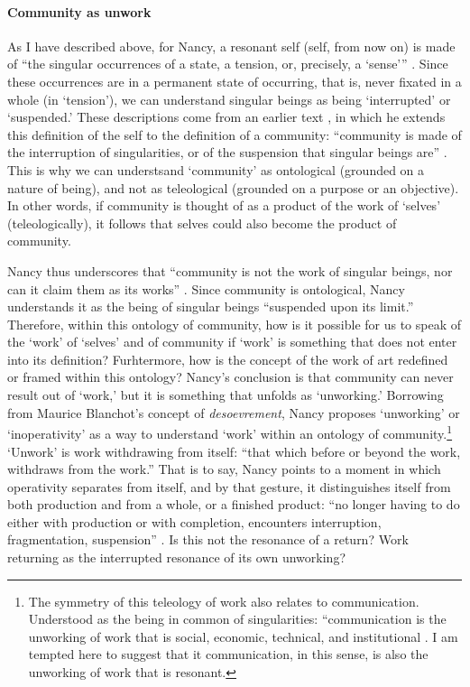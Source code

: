 \paragraph{Community as unwork}
As I have described above, for Nancy, a resonant self (self, from now on) is made of ``the singular occurrences of a state, a tension, or, precisely, a `sense''' \parencite[8]{Nan07:Lis}. Since these occurrences are in a permanent state of occurring, that is, never fixated in a whole (in `tension'), we can understand singular beings as being `interrupted' or `suspended.' These descriptions come from an earlier text \textcite{Nan91:The}, in which he extends this definition of the self to the definition of a community: ``community is made of the interruption of singularities, or of the suspension that singular beings are'' \parencite[31][All subsequent quotes from this passage.]{Nan91:The}. This is why we can understsand `community' as ontological (grounded on a nature of being), and not as teleological (grounded on a purpose or an objective). In other words, if community is thought of as a product of the work of `selves' (teleologically), it follows that selves could also become the product of community. 


Nancy thus underscores that ``community is not the work of singular beings, nor can it claim them as its works'' . Since community is ontological, Nancy understands it as the being of singular beings ``suspended upon its limit.'' Therefore, within this ontology of community, how is it possible for us to speak of the `work' of `selves' and of community if `work' is something that does not enter into its definition? Furhtermore, how is the concept of the work of art redefined or framed within this ontology? Nancy's conclusion is that community can never result out of `work,' but it is something that unfolds as `unworking.' Borrowing from Maurice Blanchot's concept of \textit{desoevrement}, Nancy proposes `unworking' or `inoperativity' as a way to understand `work' within an ontology of community.\footnote{The symmetry of this teleology of work also relates to communication. Understood as the being in common of singularities: ``communication is the unworking of work that is social, economic, technical, and institutional \parencite[31]{Nan91:The}. I am tempted here to suggest that it communication, in this sense, is also the unworking of work that is resonant.} `Unwork' is work withdrawing from itself: ``that which before or beyond the work, withdraws from the work.'' That is to say, Nancy points to a moment in which operativity separates from itself, and by that gesture, it distinguishes itself from both production and from a whole, or a finished product: ``no longer having to do either with production or with completion, encounters interruption, fragmentation, suspension'' . Is this not the resonance of a return? Work returning as the interrupted resonance of its own unworking?

